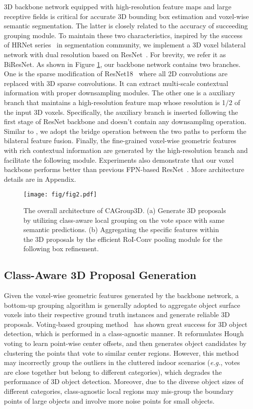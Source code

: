 \documentclass{article}
\begin{document}
3D backbone network equipped with high-resolution feature maps and large receptive fields is critical for accurate 3D bounding box estimation and voxel-wise semantic segmentation. The latter is 
closely related to the accuracy of succeeding grouping module. To maintain these two characteristics, inspired by the success of HRNet series~\cite{wang2020deep,hong2021deep,sun2019deep} in segmentation community, we implement a 3D voxel bilateral network with dual resolution based on ResNet~\cite{he2016deep}. For brevity, we refer it as BiResNet. As shown in Figure \ref{fig:overview}, our backbone network contains two branches. One is the sparse modification of ResNet18~\cite{he2016deep} where all 2D convolutions are replaced with 3D sparse convolutions. It can extract multi-scale contextual information 
with proper downsampling modules.
The other one is a auxiliary branch that maintains a high-resolution feature map whose resolution is 1/2 of the input 3D voxels. Specifically, the auxiliary branch is inserted following the first stage of ResNet backbone and doesn't contain any downsampling operation. Similar to \cite{wang2020deep}, we adopt the bridge operation between the two paths to perform the bilateral feature fusion. Finally, the fine-grained voxel-wise geometric features with rich contextual information are generated by the high-resolution branch and facilitate the following module. Experiments also demonstrate that our voxel backbone performs better than previous FPN-based ResNet~\cite{lin2017feature}. More architecture details are in Appendix.

\begin{figure}
  \centering
  \texttt{[image: fig/fig2.pdf]}
  \caption{The overall architecture of CAGroup3D. (a) Generate 3D proposals by utilizing class-aware local grouping on the vote space with same semantic predictions. (b) Aggregating the specific features within the 3D proposals by the efficient RoI-Conv pooling module for the following box refinement.}
  \label{fig:overview}
\end{figure}

\subsection{Class-Aware 3D Proposal Generation}\label{sec:proposal}
Given the voxel-wise geometric features generated by the backbone network, a bottom-up grouping algorithm 
is generally adopted
to aggregate object surface voxels into their respective ground truth instances and generate reliable 3D proposals. Voting-based grouping method~\cite{qi2019deep} has shown great success for 3D object detection, which is performed in a class-agnostic manner.
It reformulates Hough voting to learn point-wise center offsets, and then generates object candidates by clustering the points that vote to similar center regions.
However, this method may incorrectly group the outliers in the cluttered indoor scenarios (\textit{e.g.}, votes are close together but belong to different categories), which 
degrades the performance of 
3D object detection. Moreover, due to the diverse object sizes of different categories, class-agnostic local regions may mis-group the boundary points of large objects and involve more noise points for small objects.
\end{document}

